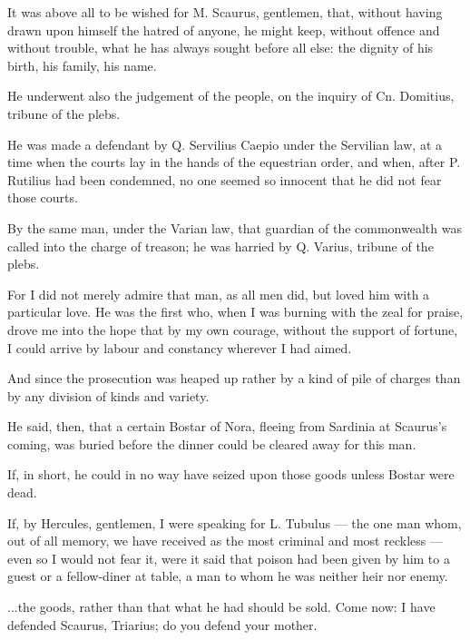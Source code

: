 
 It was above all to be wished for M. Scaurus, gentlemen, that, without having drawn upon himself the hatred of anyone, he might keep, without offence and without trouble, what he has always sought before all else: the dignity of his birth, his family, his name.

 He underwent also the judgement of the people, on the inquiry of Cn. Domitius, tribune of the plebs.

 He was made a defendant by Q. Servilius Caepio under the Servilian law, at a time when the courts lay in the hands of the equestrian order, and when, after P. Rutilius had been condemned, no one seemed so innocent that he did not fear those courts.

 By the same man, under the Varian law, that guardian of the commonwealth was called into the charge of treason; he was harried by Q. Varius, tribune of the plebs.

 For I did not merely admire that man, as all men did, but loved him with a particular love. He was the first who, when I was burning with the zeal for praise, drove me into the hope that by my own courage, without the support of fortune, I could arrive by labour and constancy wherever I had aimed.

 And since the prosecution was heaped up rather by a kind of pile of charges than by any division of kinds and variety.

 He said, then, that a certain Bostar of Nora, fleeing from Sardinia at Scaurus's coming, was buried before the dinner could be cleared away for this man.

 If, in short, he could in no way have seized upon those goods unless Bostar were dead.

 If, by Hercules, gentlemen, I were speaking for L. Tubulus --- the one man whom, out of all memory, we have received as the most criminal and most reckless --- even so I would not fear it, were it said that poison had been given by him to a guest or a fellow-diner at table, a man to whom he was neither heir nor enemy.

 ...the goods, rather than that what he had should be sold. Come now: I have defended Scaurus, Triarius; do you defend your mother.

